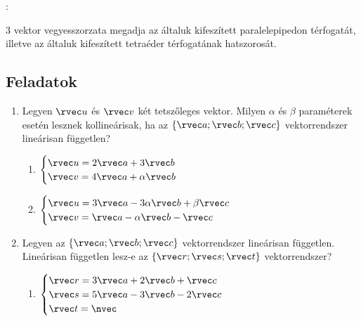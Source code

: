 \documentclass[a4paper, 12pt]{scrartcl}
\begin{document}
\begin{note}
  :

  3 vektor vegyesszorzata megadja az általuk kifeszített paralelepipedon
  térfogatát, illetve az általuk kifeszített tetraéder térfogatának hatszorosát.
\end{note}

\clearpage
\subsection{Feladatok}

\begin{enumerate}
  \item Legyen $\rvec u$ és $\rvec v$ két tetszőleges vektor. Milyen $\alpha$ és
        $\beta$ paraméterek esetén lesznek kollineárisak, ha az $\{ \rvec a;
          \rvec b; \rvec c \}$ vektorrendszer lineárisan független?
        \begin{multicols}{2}
          \begin{enumerate}
            \item $
                    \begin{cases}
                      \rvec u = 2 \rvec a + 3 \rvec b \\
                      \rvec v = 4 \rvec a + \alpha \rvec b
                    \end{cases}
                  $

            \item $
                    \begin{cases}
                      \rvec u = 3 \rvec a - 3 \alpha \rvec b + \beta \rvec c \\
                      \rvec v = \rvec a - \alpha \rvec b - \rvec c
                    \end{cases}
                  $
          \end{enumerate}
        \end{multicols}

  \item Legyen az $\{ \rvec a; \rvec b; \rvec c \}$ vektorrendszer lineárisan
        független. Lineárisan független lesz-e az $\{ \rvec r; \rvec s;
          \rvec t \}$ vektorrendszer?
        \begin{multicols}{2}
          \begin{enumerate}
            \item $
                    \begin{cases}
                      \rvec r = 3 \rvec a + 2 \rvec b +   \rvec c \\
                      \rvec s = 5 \rvec a - 3 \rvec b - 2 \rvec c \\
                      \rvec t = \nvec
                    \end{cases}
                  $


\end{enumerate}
\end{multicols}
\end{enumerate}
\end{document}
